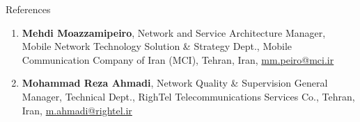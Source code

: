 \documentclass{resume}
\begin{document}
\begin{rSection}{References}
\begin{enumerate}[left=-4mm]
\item \textbf{Mehdi Moazzamipeiro}, Network and Service Architecture Manager, Mobile Network Technology Solution \& Strategy Dept., Mobile Communication Company of Iran (MCI), Tehran, Iran, \href{https://www.linkedin.com/in/mehdi-moazzamipeiro-9088a734/}{} \href{https://www.mci.ir/web/en/home}{} \href{mmpeiro@yahoo.com}{mm.peiro@mci.ir}
\item \textbf{Mohammad Reza Ahmadi}, Network Quality \& Supervision General Manager, Technical Dept., RighTel Telecommunications Services Co., Tehran, Iran, \href{https://www.linkedin.com/in/mohammad-reza-ahmadi-bidhendi/}{} \href{https://www.rightel.ir/en/home}{} \href{mailto:mohammad.reze.ahmadi@gmail.com}{m.ahmadi@rightel.ir}
\end{enumerate}
\end{rSection}
\end{document}
